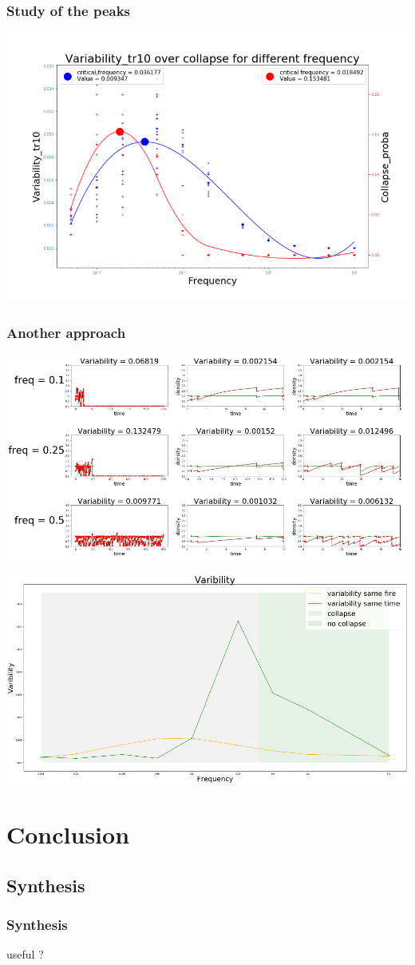 \documentclass{beamer}
\begin{document}
\begin{frame}
\frametitle{Study of the peaks}
\includegraphics[width=9.cm]{2_peaks.png}
\end{frame}


\begin{frame}
\frametitle{Another approach}
\includegraphics[width=9.cm]{same_fire.png}
\end{frame}


\begin{frame}
\includegraphics[width=9.cm]{variability.png}
\end{frame}


\section{Conclusion}

\subsection{Synthesis}
\begin{frame}
\frametitle{Synthesis}
useful ?
\end{frame}
\end{document}
